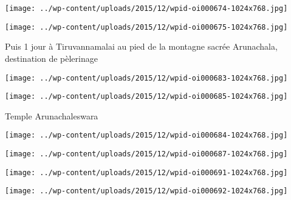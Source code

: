 \begin{center} \texttt{[image: ../wp-content/uploads/2015/12/wpid-oi000674-1024x768.jpg]} \end{center}

 

 

\begin{center} \texttt{[image: ../wp-content/uploads/2015/12/wpid-oi000675-1024x768.jpg]} \end{center}

 

 Puis 1 jour à Tiruvannamalai au pied de la montagne sacrée Arunachala, destination de pèlerinage 

 

\begin{center} \texttt{[image: ../wp-content/uploads/2015/12/wpid-oi000683-1024x768.jpg]} \end{center}

 

 

\begin{center} \texttt{[image: ../wp-content/uploads/2015/12/wpid-oi000685-1024x768.jpg]} \end{center}

 

 Temple Arunachaleswara 

 

\begin{center} \texttt{[image: ../wp-content/uploads/2015/12/wpid-oi000684-1024x768.jpg]} \end{center}

 

 

\begin{center} \texttt{[image: ../wp-content/uploads/2015/12/wpid-oi000687-1024x768.jpg]} \end{center}

 

 

\begin{center} \texttt{[image: ../wp-content/uploads/2015/12/wpid-oi000691-1024x768.jpg]} \end{center}

 

 

\begin{center} \texttt{[image: ../wp-content/uploads/2015/12/wpid-oi000692-1024x768.jpg]} \end{center}

